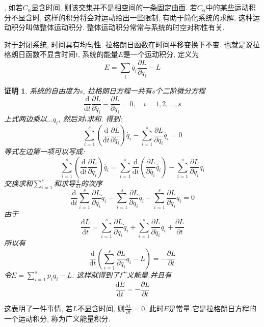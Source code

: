 \documentclass[a4paper,11pt]{article}
\theoremstyle{mystyle}
\newtheorem{Proof}{\hspace{2em}证明}[section]
\begin{document}
, 如若$C_\alpha$显含时间, 则该交集并不是相空间的一条固定曲面. 若$C_\alpha$中的某些运动积分不显含时, 这样的积分将会对运动给出一些限制, 有助于简化系统的求解, 这种运动积分叫做整体运动积分. 整体运动积分常常与系统的时空对称性有关.
\begin{definition}[广义能量]
  对于封闭系统, 时间具有均匀性. 拉格朗日函数在时间平移变换下不变. 也就是说拉格朗日函数不显含时间$t$, 系统的能量$E$是一个运动积分, 定义为
  \begin{equation}\label{General Enery}
    E=\sum_{i}\dot{q_i}\frac{\partial{L}}{\partial{\dot{q_i}}}-L
  \end{equation}
\end{definition}
\begin{Proof}
系统的自由度为$s$, 拉格朗日方程一共有$s$个二阶微分方程
\begin{equation*}
  \frac{\mathrm{d}}{\mathrm{d}t}\frac{\partial{L}}{\partial{\dot{q_i}}}-\frac{\partial{L}}{\partial{q_i}}=0,\quad i=1,2,\dots,s
\end{equation*}
上式两边乘以$\dots{q_i}$, 然后对$i$求和. 得到:
\begin{equation*}
  \sum_{i=1}^{s}\left(\frac{\mathrm{d}}{\mathrm{d}t}\frac{\partial{L}}{\partial{\dot{q_i}}}\right)\dot{q_i}-\sum_{i=1}^{s}\frac{\partial{L}}{\partial{q_i}}\dot{q_i}=0
\end{equation*}
等式左边第一项可以写成:
\begin{equation*}
  \sum_{i=1}^{s}\left(\frac{\mathrm{d}}{\mathrm{d}t}\frac{\partial{L}}{\partial{\dot{q_i}}}\right)\dot{q_i}=\sum_{i=1}^{s}\frac{\mathrm{d}}{\mathrm{d}t}\left(\frac{\partial L}{\partial{\dot{q_i}}}\dot{q_i}\right)-\sum_{i=1}^{s}\frac{\partial L}{\partial{\dot{q_i}}}\ddot{q_i}
\end{equation*}
交换求和$\sum_{i=1}^{s}$和求导$\frac{\mathrm{d}}{\mathrm{d}t}$的次序
\begin{equation*}
  \frac{\mathrm{d}}{\mathrm{d} t } \sum _ { i = 1 } ^ { s } \frac { \partial L } { \partial\dot{q}_{i}}\dot{q}_{i}-\sum_{i=1}^{s}\frac{\partial L}{\partial q_{i}}\dot{q}_{i}-\sum_{i=1}^{s}\frac{\partial L}{\partial\dot{q}_{i}}\ddot{q}_{i}=0
\end{equation*}
由于
\begin{equation*}
  \frac{\mathrm{d}L}{\mathrm{d}t}=\sum_{i=1}^{s}\frac{\partial L}{\partial q_{i}}\dot{q}_{i}+\sum_{i=1}^{s}\frac{\partial L}{\partial\dot{q}_{i}}\ddot{q}_{i}+\frac{\partial L}{\partial t}
\end{equation*}
所以有
\begin{equation*}
  \frac{\mathrm{d}}{\mathrm{d}t}\left(\sum_{i=1}^{s}\frac{\partial L}{\partial\dot{q}_{i}}\dot{q}_{i}-L\right)=-\frac{\partial L}{\partial t}
\end{equation*}
令$E=\sum_{i=1}^{s}p_{i}\dot{q}_{i}-L$. 这样就得到了广义能量.并且有
\begin{equation*}
  \frac{\mathrm{d}E}{\mathrm{d}t}=-\frac{\partial L}{\partial t}
\end{equation*}
\end{Proof}
这表明了一件事情, 若$L$不显含时间, 则$\frac{\partial L}{\partial t}=0$, 此时$E$是常量.它是拉格朗日方程的一个运动积分, 称为广义能量积分.
\end{document}
